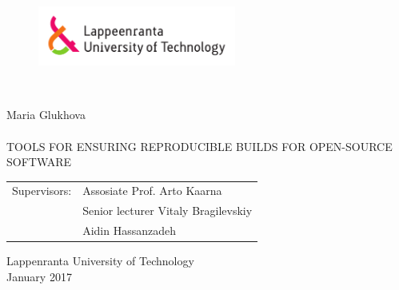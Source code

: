 
\thispagestyle{empty} \setlength{\parindent}{0pt}
\begin{figure}
\includegraphics[width=65mm]{./figs/Merkki_Logo_CMYK}\\
\end{figure}
~\\

\vspace{60mm}

{\sffamily\large Maria Glukhova\\
\\
\MakeUppercase{\Large Tools for Ensuring Reproducible Builds for Open-Source Software}}\\




\begin{tabular}{l p{11.0cm}}
  
Supervisors: & Assosiate Prof. Arto Kaarna\\
& Senior lecturer Vitaly Bragilevskiy\\
& Aidin Hassanzadeh\\

\end {tabular}





\begin{center}
Lappenranta University of Technology\\
January 2017

 \end{center}
\pagebreak

\thispagestyle{empty}
